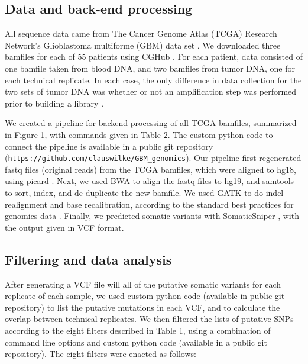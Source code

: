 \documentclass[11pt]{article} %
\begin{document}
\subsection*{Data and back-end processing}

All sequence data came from The Cancer Genome Atlas (TCGA) Research Network's Glioblastoma multiforme (GBM) data set \citep{TCGA-GBM}. We downloaded three bamfiles for each of 55 patients using CGHub \citep{CGHub}. For each patient, data consisted of one bamfile taken from blood DNA, and two bamfiles from tumor DNA, one for each technical replicate. In each case, the only difference in data collection for the two sets of tumor DNA was whether or not an amplification step was performed prior to building a library \citep{TCGA-GBM}. 

We created a pipeline for backend processing of all TCGA bamfiles, summarized in Figure 1, with commands given in Table 2. The custom python code to connect the pipeline is available in a public 
git repository (\texttt{https://github.com/clauswilke/GBM\_genomics}). Our pipeline first regenerated fastq files (original reads) from the TCGA bamfiles, which were aligned to hg18, using picard \citep{picard}. Next, we used BWA \citep{bwa} to align the fastq files to hg19, and samtools \citep{SAMtools} to sort, index, and de-duplicate the new bamfile. We used GATK \citep{GATK} to do indel realignment and base recalibration, according to the standard best practices for genomics data \citep{best-practices}. Finally, we predicted somatic variants with SomaticSniper \citep{SomaticSniper}, with the output given in VCF format.

\subsection*{Filtering and data analysis}

After generating a VCF file will all of the putative somatic variants for each replicate of each sample, we used custom python code (available in public git repository) to list the putative mutations in each VCF, and to calculate the overlap between technical replicates. We then filtered the lists of putative SNPs according to the eight filters described in Table 1, using a combination of command line options and custom python code (available in a public git repository). The eight filters were enacted as follows: 
\end{document}
